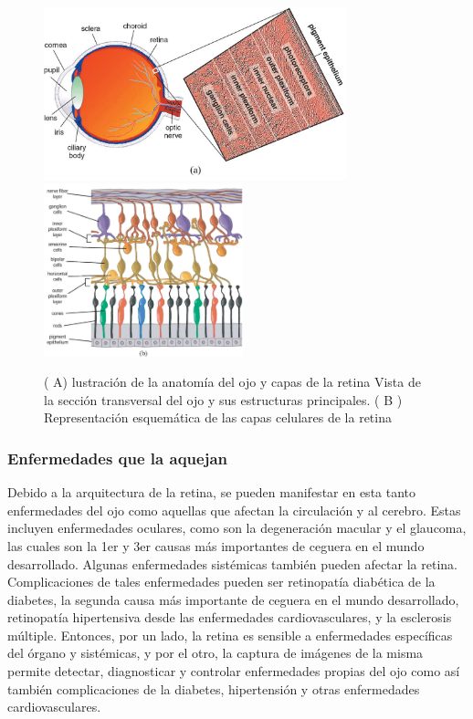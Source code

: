 \begin{figure}[H]
\centering
\includegraphics[height=5cm]{./Figures/retina_a.png}
\includegraphics[height=5cm]{./Figures/retina_b.png}
\label{fig:retina}
\caption{( A) lustración de la anatomía del ojo y capas de la retina  Vista de la sección transversal
del ojo y sus estructuras principales. ( B ) Representación esquemática de las capas celulares de la retina}
\end{figure}

			\subsubsection{Enfermedades que la aquejan}
			
Debido a la arquitectura de la retina, se pueden manifestar en esta tanto enfermedades del ojo como aquellas que afectan la circulación y al cerebro. Estas incluyen enfermedades oculares, como son la degeneración macular y el glaucoma, las cuales son la 1er y 3er causas más importantes de ceguera en el mundo desarrollado. Algunas enfermedades sistémicas también pueden afectar la retina. Complicaciones de tales enfermedades pueden ser retinopatía diabética de la diabetes, la segunda causa más importante de ceguera en el mundo desarrollado, retinopatía hipertensiva desde las enfermedades cardiovasculares, y la esclerosis múltiple. Entonces, por un lado, la retina es sensible a enfermedades específicas del órgano y sistémicas, y por el otro, la captura de imágenes de la misma permite detectar, diagnosticar y controlar enfermedades propias del ojo como así también complicaciones de la diabetes, hipertensión y otras enfermedades cardiovasculares.
			




